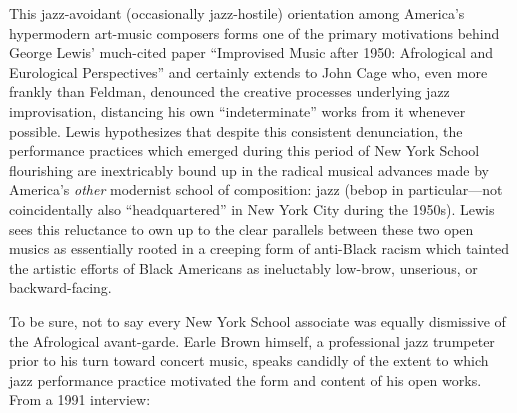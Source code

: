     This jazz-avoidant (occasionally jazz-hostile) orientation among America's hypermodern art-music composers forms one of the primary motivations behind George Lewis' much-cited paper ``Improvised Music after 1950: Afrological and Eurological Perspectives'' and certainly extends to John Cage who, even more frankly than Feldman, denounced the creative processes underlying jazz improvisation, distancing his own ``indeterminate'' works from it whenever possible. Lewis hypothesizes that despite this consistent denunciation, the performance practices which emerged during this period of New York School flourishing are inextricably bound up in the radical musical advances made by America's \textit{other} modernist school of composition: jazz (bebop in particular---not coincidentally also ``headquartered'' in New York City during the 1950s). Lewis sees this reluctance to own up to the clear parallels between these two open musics as essentially rooted in a creeping form of anti-Black racism which tainted the artistic efforts of Black Americans as ineluctably low-brow, unserious, or backward-facing. 

    To be sure, not to say every New York School associate was equally dismissive of the Afrological avant-garde. Earle Brown himself, a professional jazz trumpeter prior to his turn toward concert music, speaks candidly of the extent to which jazz performance practice motivated the form and content of his open works. From a 1991 interview:

